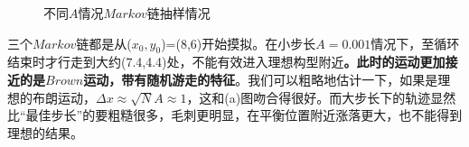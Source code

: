 \documentclass[UTF8]{ctexart}
\begin{document}
\begin{flushleft}
			\begin{figure}[H]
					\centering  %
					\caption{不同$A$情况$Markov$链抽样情况}
					
				\end{figure}
		
		\qquad 三个$Markov$链都是从($x_0,y_0$)=(8,6)开始摸拟。在小步长$A=0.001$情况下，至循环结束时才行走到大约(7.4,4.4)处，不能有效进入理想构型附近\textbf{。此时的运动更加接近的是$Brown$运动，带有随机游走的特征}。我们可以粗略地估计一下，如果是理想的布朗运动，$\Delta x\approx \sqrt{N}A\approx1$，这和(a)图吻合得很好。而大步长下的轨迹显然比“最佳步长”的要粗糙很多，毛刺更明显，在平衡位置附近涨落更大，也不能得到理想的结果。
		
	
	
	\end{flushleft}
	
\end{document}
